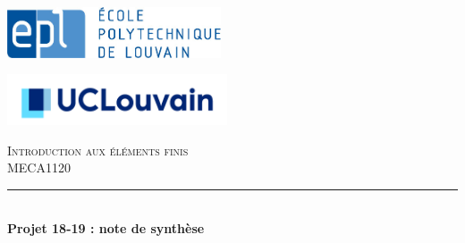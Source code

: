 \documentclass{article}
\begin{document}
\begin{titlepage} %
	\newcommand{\HRule}{\rule{\linewidth}{0.5mm}} %
	
	\begin{minipage}[t]{0.30\linewidth}
		\includegraphics[height=1.5cm]{Images/logo_EPL.jpg}
	\end{minipage} \hfill
	\begin{minipage}[t]{0.35\linewidth}
		\includegraphics[height=1.5cm]{Images/logo_UCL.jpg}
	\end{minipage}
	
	\center %
	
	
	
	
	\vspace{1.5cm}
	\textsc{\Large Introduction aux éléments finis}\\[0.5cm] %
	
	\textsc{\large MECA1120}\\[1.0cm] %
	
	
	\HRule\\[0.65cm]
	
	{\huge\bfseries Projet 18-19 : note de synthèse}\\[0.4cm] %
	

\end{titlepage}
\end{document}
